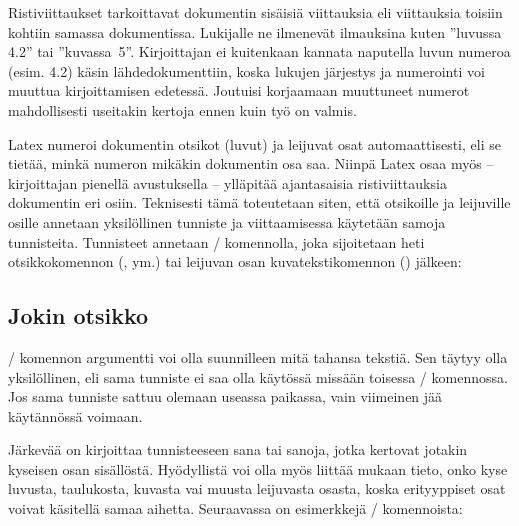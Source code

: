 Ristiviittaukset tarkoittavat dokumentin sisäisiä viittauksia eli
viittauksia toisiin kohtiin samassa dokumentissa. Lukijalle ne ilmenevät
ilmauksina kuten ''luvussa 4.2'' tai ''kuvassa~5''. Kirjoittajan ei
kuitenkaan kannata naputella luvun numeroa (esim. 4.2) käsin
lähdedokumenttiin, koska lukujen järjestys ja numerointi voi muuttua
kirjoittamisen edetessä. Joutuisi korjaamaan muuttuneet numerot
mahdollisesti useitakin kertoja ennen kuin työ on valmis.

Latex numeroi dokumentin otsikot (luvut) ja leijuvat osat
automaattisesti, eli se tietää, minkä numeron mikäkin dokumentin osa
saa. Niinpä Latex osaa myös -- kirjoittajan pienellä avustuksella --
ylläpitää ajantasaisia ristiviittauksia dokumentin eri osiin. Teknisesti
tämä toteutetaan siten, että otsikoille ja leijuville osille annetaan
yksilöllinen tunniste ja viittaamisessa käytetään samoja tunnisteita.
Tunnisteet annetaan \-/ komennolla, joka sijoitetaan heti
otsikkokomennon (,  ym.) tai
leijuvan osan kuvatekstikomennon () jälkeen:

\begin{koodilohkosis}
\section{Jokin otsikko}
\label{tunniste}
\end{koodilohkosis}

\noindent
{}\-/ komennon argumentti  voi olla
suunnilleen mitä tahansa tekstiä. Sen täytyy olla yksilöllinen, eli sama
tunniste ei saa olla käytössä missään toisessa \-/
komennossa. Jos sama tunniste sattuu olemaan useassa paikassa, vain
viimeinen jää käytännössä voimaan.

Järkevää on kirjoittaa tunnisteeseen sana tai sanoja, jotka kertovat
jotakin kyseisen osan sisällöstä. Hyödyllistä voi olla myös liittää
mukaan tieto, onko kyse luvusta, taulukosta, kuvasta vai muusta
leijuvasta osasta, koska erityyppiset osat voivat käsitellä samaa
aihetta. Seuraavassa on esimerkkejä \-/ komennoista:

\begin{koodilohkosis}
\label{luku/fonttien-valinta}    %
\label{tlk/fonttikomentoja}      %
\label{kuva/kirjainleikkauksia}  %
\end{koodilohkosis}

